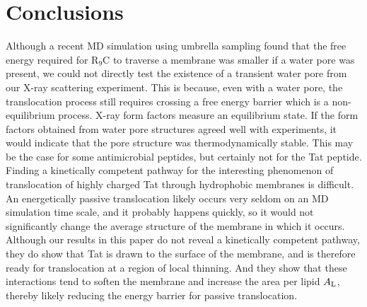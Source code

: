 \section{Conclusions}\label{sec:conclusion}
Although a recent MD simulation using umbrella sampling \cite{Huang13} found 
that the free energy required for R$_9$C to traverse a membrane was smaller 
if a water pore was present, we could not directly test the existence of a 
transient water pore from our X-ray scattering experiment. 
This is because, even with a water pore, the translocation process still 
requires crossing a free energy barrier which is a non-equilibrium process. 
X-ray form factors measure an equilibrium state. If the form factors obtained 
from water pore structures agreed well with experiments, it would indicate 
that the pore structure was thermodynamically stable. This may be the case for 
some antimicrobial peptides, but certainly not for the Tat peptide.
Finding a kinetically competent pathway for the interesting phenomenon of 
translocation of highly charged Tat through hydrophobic membranes is difficult. 
An energetically passive translocation likely occurs very seldom on an MD 
simulation time scale, and it probably happens quickly, so it would not 
significantly change the average structure of the membrane in which it occurs. 
Although our results in this paper do not reveal a kinetically competent 
pathway, they do show that Tat is drawn to the surface of the membrane, and is 
therefore ready for translocation at a region of local thinning. And they show 
that these interactions tend to soften the membrane and increase
the area per lipid $A_\textrm{L}$, thereby likely reducing the energy barrier for 
passive translocation.
